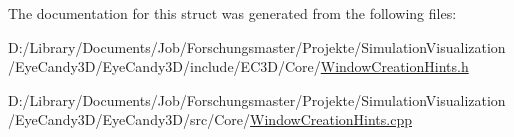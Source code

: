 The documentation for this struct was generated from the following files\+:\begin{DoxyCompactItemize}
\item 
D\+:/\+Library/\+Documents/\+Job/\+Forschungsmaster/\+Projekte/\+Simulation\+Visualization/\+Eye\+Candy3\+D/\+Eye\+Candy3\+D/include/\+E\+C3\+D/\+Core/\mbox{\hyperlink{_window_creation_hints_8h}{Window\+Creation\+Hints.\+h}}\item 
D\+:/\+Library/\+Documents/\+Job/\+Forschungsmaster/\+Projekte/\+Simulation\+Visualization/\+Eye\+Candy3\+D/\+Eye\+Candy3\+D/src/\+Core/\mbox{\hyperlink{_window_creation_hints_8cpp}{Window\+Creation\+Hints.\+cpp}}\end{DoxyCompactItemize}
